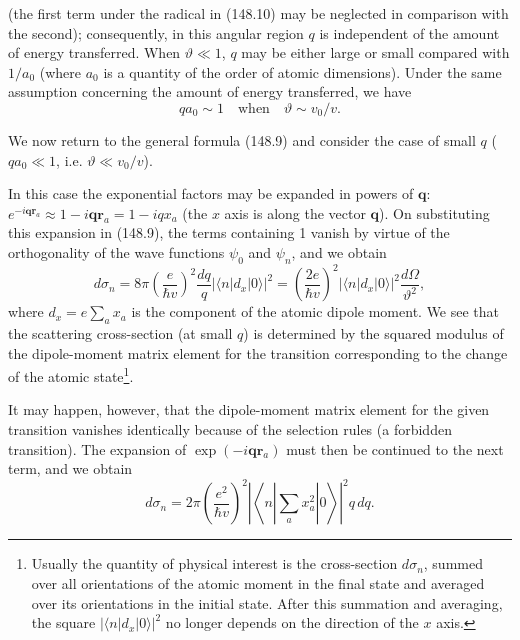 (the first term under the radical in (148.10) may be neglected in comparison
with the second); consequently, in this angular region $q$ is independent of
the amount of energy transferred. When $\vartheta\ll1$, $q$ may be either
large or small compared with $1/a_0$ (where $a_0$ is a quantity of the order
of atomic dimensions). Under the same assumption concerning the amount of
energy transferred, we have
\begin{equation}
 qa_0\sim1\quad\text{when}\quad\vartheta\sim v_0/v.
 \tag{148.13}
\end{equation}

We now return to the general formula (148.9) and consider the case of small
$q$ ($qa_0\ll1$, i.e. $\vartheta\ll v_0/v$).

In this case the exponential factors may be expanded in powers of $\mathbf q$:
$e^{-i\mathbf q\mathbf r_a}\approx1-i\mathbf q\mathbf r_a=1-iqx_a$ (the
$x$ axis is along the vector $\mathbf q$). On substituting this expansion in
(148.9), the terms containing 1 vanish by virtue of the orthogonality of the
wave functions $\psi_0$ and $\psi_n$, and we obtain
\begin{equation}
 d\sigma_n=8\pi\left(\frac{e}{\hbar v}\right)^2\frac{dq}{q}|\langle n|d_x|0\rangle|^2
 =\left(\frac{2e}{\hbar v}\right)^2|\langle n|d_x|0\rangle|^2\frac{d\Omega}{\vartheta^2},
 \tag{148.14}
\end{equation}
where $d_x=e\sum_a x_a$ is the component of the atomic dipole moment. We see
that the scattering cross-section (at small $q$) is determined by the squared
modulus of the dipole-moment matrix element for the transition corresponding
to the change of the atomic state\footnote{Usually the quantity of physical
interest is the cross-section $d\sigma_n$, summed over all orientations of the
atomic moment in the final state and averaged over its orientations in the
initial state. After this summation and averaging, the square
$|\langle n|d_x|0\rangle|^2$ no longer depends on the direction of the $x$
axis.}.

It may happen, however, that the dipole-moment matrix element for the given
transition vanishes identically because of the selection rules (a forbidden
transition). The expansion of $\exp(-i\mathbf q\mathbf r_a)$ must then be
continued to the next term, and we obtain
\begin{equation}
 d\sigma_n=2\pi\left(\frac{e^2}{\hbar v}\right)^2
 \left|\left\langle n\left|\sum_a x_a^2\right|0\right\rangle\right|^2q\,dq.
 \tag{148.15}
\end{equation}


